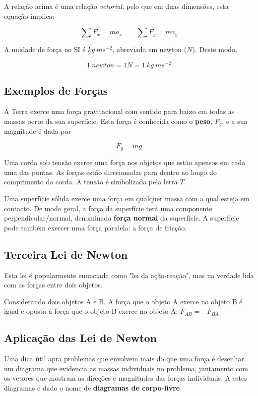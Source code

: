 A relação acima é uma relação \emph{vetorial}, pelo que em duas dimensões, esta equação implica:

\begin{equation}\label{eqn:2newton}
    \sum F_x=ma_x \qquad \sum F_y=ma_y
\end{equation}

A unidade de força no SI é $kg\ ms^{-2}$, abreviada em newton ($N$). Deste modo,

\begin{equation*}
    1\ newton = 1 N = 1\ kg\ ms^{-2}
\end{equation*}

\subsection{Exemplos de Forças}
A Terra exerce uma força gravitacional com sentido para baixo em todas as massas perto da sua superfície. Esta força é conhecida como o \textbf{peso}, $F_g$, e a sua magnitude é dada por

\begin{equation}
    F_g=mg    
\end{equation}

Uma corda sob tensão exerce uma força nos objetos que estão apensos em cada uma das pontas. As forças estão direcionadas para dentro ao longo do comprimento da corda. A tensão é simbolizada pela letra $T$.

Uma superfície sólida exerce uma força em qualquer massa com a qual esteja em contacto. De modo geral, a força da superfície terá uma componente perpendicular/normal, denominada \textbf{força normal} da superfície. A superfície pode também exercer uma força paralela: a força de fricção.

\subsection{Terceira Lei de Newton}
Esta lei é popularmente enunciada como "lei da ação-reação", mas na verdade lida com as forças entre dois objetos.

\begin{definition} Considerando dois objetos A e B. A força que o objeto A exerce no objeto B é igual e oposta à força que o objeto B exerce no objeto A: $F_{AB}=-F_{BA}$
\end{definition}

\subsection{Aplicação das Lei de Newton}
Uma dica útil apra problemas que envolvem mais do que uma força é desenhar um diagrama que evidencia as massas individuais no problema, juntamento com os vetores que mostram as direções e magnitudes das forças individuais. A estes diagramas é dado o nome de \textbf{diagramas de corpo-livre}.

